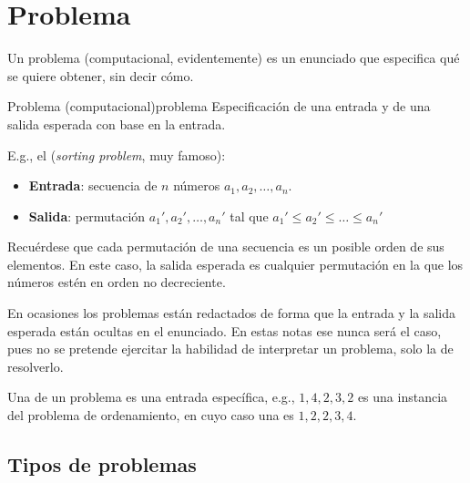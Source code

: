 \section{Problema}
\label{subsec:problema}

Un problema (computacional, evidentemente) es un enunciado que especifica qué se quiere obtener, sin decir cómo.
\begin{definicion}{Problema (computacional)}{problema}
Especificación de una entrada y de una salida esperada con base en la entrada.
\end{definicion}

E.g., el  (\textit{sorting problem}, muy famoso):
\begin{itemize}
  \item \textbf{Entrada}: secuencia de \(n\) números \(a_1, a_2,\ldots,a_n\).
  \item \textbf{Salida}: permutación \(a_1', a_2',\ldots,a_n'\) tal que \(a_1' \leq a_2' \leq \ldots \leq a_n'\)
\end{itemize}
Recuérdese que cada permutación de una secuencia es un posible orden de sus elementos. En este caso, la salida esperada es cualquier permutación en la que los números estén en orden no decreciente.

En ocasiones los problemas están redactados de forma que la entrada y la salida esperada están ocultas en el enunciado. En estas notas ese nunca será el caso, pues no se pretende ejercitar la habilidad de interpretar un problema, solo la de resolverlo.

Una  de un problema es una entrada específica, e.g., \(1, 4, 2, 3, 2\) es una instancia del problema de ordenamiento, en cuyo caso una  es \(1, 2, 2, 3, 4\).

\subsection{Tipos de problemas}

